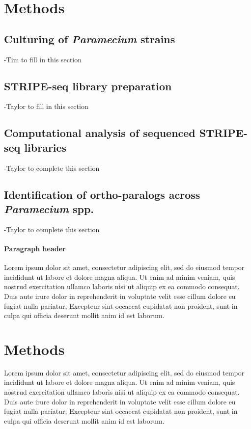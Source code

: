 \documentclass[nogrid]{MBE}%
\begin{document}
\section{Methods}

\subsection{Culturing of \textit{Paramecium} strains}
-Tim to fill in this section

\subsection{STRIPE-seq library preparation}
-Taylor to fill in this section

\subsection{Computational analysis of sequenced STRIPE-seq libraries}
-Taylor to complete this section

\subsection{Identification of ortho-paralogs across \textit{Paramecium} spp.}
-Taylor to complete this section

\paragraph{Paragraph header} 

Lorem ipsum dolor sit amet, consectetur adipiscing elit, sed do eiusmod tempor incididunt ut labore et dolore magna aliqua. Ut enim ad minim veniam, quis nostrud exercitation ullamco laboris nisi ut aliquip ex ea commodo consequat. Duis aute irure dolor in reprehenderit in voluptate velit esse cillum dolore eu fugiat nulla pariatur. Excepteur sint occaecat cupidatat non proident, sunt in culpa qui officia deserunt mollit anim id est laborum.

\section{{Methods}\label{sec:Methods}}

Lorem ipsum dolor sit amet, consectetur adipiscing elit, sed do eiusmod tempor incididunt ut labore et dolore magna aliqua. Ut enim ad minim veniam, quis nostrud exercitation ullamco laboris nisi ut aliquip ex ea commodo consequat. Duis aute irure dolor in reprehenderit in voluptate velit esse cillum dolore eu fugiat nulla pariatur. Excepteur sint occaecat cupidatat non proident, sunt in culpa qui officia deserunt mollit anim id est laborum.
\end{document}
